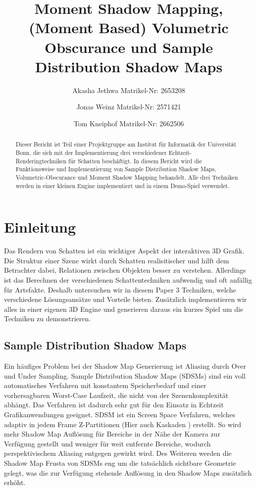 \documentclass[runningheaders,a4paper]{llncs}
\title{ Moment Shadow Mapping, (Moment Based) Volumetric Obscurance und Sample Distribution Shadow Maps }
\author{
	Akasha Jethwa 
	Matrikel-Nr: 2653208
	\and
	Jonas Weinz 
	Matrikel-Nr: 2571421
	\and
	Tom Kneiphof 
	Matrikel-Nr: 2662506
}
\institute{Institut für Informatik der Universität Bonn}
\begin{document}
\maketitle

\begin{abstract}
Dieser Bericht ist Teil einer Projektgruppe am Institut für Informatik der Universität Bonn,
die sich mit der Implementierung drei verschiedener Echtzeit-Renderingtechniken für Schatten beschäftigt.
In diesem Bericht wird die Funktionsweise und Implementierung von Sample Distribution Shadow Maps, Volumetric-Obscurance und Moment Shadow Mapping behandelt.
Alle drei Techniken werden in einer kleinen Engine implementiert und in einem Demo-Spiel verwendet.
\end{abstract}


\section{Einleitung}
Das Rendern von Schatten ist ein wichtiger Aspekt der interaktiven 3D Grafik.
Die Struktur einer Szene wirkt durch Schatten realisitischer und hilft dem Betrachter dabei, Relationen zwischen Objekten besser zu verstehen.
Allerdings ist das Berechnen der verschiedenen Schattentechniken aufwendig und oft anfällig für Artefakte.
Deshalb untersuchen wir in diesem Paper 3 Techniken, welche verschiedene Lösungsansätze und Vorteile bieten.
Zusätzlich implementieren wir alles in einer eigenen 3D Engine und generieren daraus ein kurzes Spiel um die Techniken zu demonstrieren.


\subsection{Sample Distribution Shadow Maps}

Ein häufiges Problem bei der Shadow Map Generierung ist Aliasing durch Over und Under Sampling.
Sample Distribution Shadow Maps (SDSMs) \cite{sdsm} sind ein voll automatisches Verfahren mit konstantem Speicherbedarf und einer vorhersagbaren Worst-Case Laufzeit, die nicht von der Szenenkomplexität abhängt.
Das Verfahren ist dadurch sehr gut für den Einsatz in Echtzeit Grafikanwendungen geeignet.
SDSM ist ein Screen Space Verfahren, welches adaptiv in jedem Frame Z-Partitionen \cite{zpart} (Hier auch Kaskaden \cite{csm}) erstellt.
So wird mehr Shadow Map Auflösung für Bereiche in der Nähe der Kamera zur Verfügung gestellt und weniger für weit entfernte Bereiche, wodurch perspektivischem Aliasing entgegen gewirkt wird.
Des Weiteren werden die Shadow Map Frusta von SDSMs eng um die tatsächlich sichtbare Geometrie gelegt, was die zur Verfügung stehende Auflösung in den Shadow Maps zusätzlich erhöht.
\end{document}
